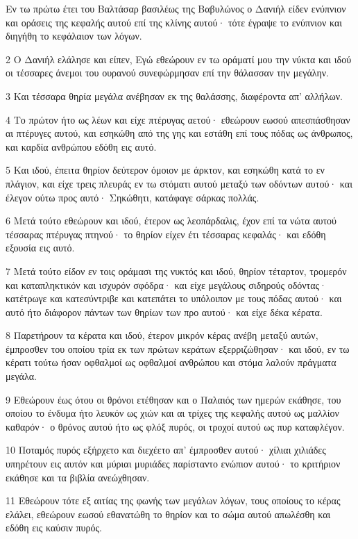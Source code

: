 \par Εν τω πρώτω έτει του Βαλτάσαρ βασιλέως της Βαβυλώνος ο Δανιήλ είδεν ενύπνιον και οράσεις της κεφαλής αυτού επί της κλίνης αυτού· τότε έγραψε το ενύπνιον και διηγήθη το κεφάλαιον των λόγων.
\par 2 Ο Δανιήλ ελάλησε και είπεν, Εγώ εθεώρουν εν τω οράματί μου την νύκτα και ιδού οι τέσσαρες άνεμοι του ουρανού συνεφώρμησαν επί την θάλασσαν την μεγάλην.
\par 3 Και τέσσαρα θηρία μεγάλα ανέβησαν εκ της θαλάσσης, διαφέροντα απ' αλλήλων.
\par 4 Το πρώτον ήτο ως λέων και είχε πτέρυγας αετού· εθεώρουν εωσού απεσπάσθησαν αι πτέρυγες αυτού, και εσηκώθη από της γης και εστάθη επί τους πόδας ως άνθρωπος, και καρδία ανθρώπου εδόθη εις αυτό.
\par 5 Και ιδού, έπειτα θηρίον δεύτερον όμοιον με άρκτον, και εσηκώθη κατά το εν πλάγιον, και είχε τρεις πλευράς εν τω στόματι αυτού μεταξύ των οδόντων αυτού· και έλεγον ούτω προς αυτό· Σηκώθητι, κατάφαγε σάρκας πολλάς.
\par 6 Μετά τούτο εθεώρουν και ιδού, έτερον ως λεοπάρδαλις, έχον επί τα νώτα αυτού τέσσαρας πτέρυγας πτηνού· το θηρίον είχεν έτι τέσσαρας κεφαλάς· και εδόθη εξουσία εις αυτό.
\par 7 Μετά τούτο είδον εν τοις οράμασι της νυκτός και ιδού, θηρίον τέταρτον, τρομερόν και καταπληκτικόν και ισχυρόν σφόδρα· και είχε μεγάλους σιδηρούς οδόντας· κατέτρωγε και κατεσύντριβε και κατεπάτει το υπόλοιπον με τους πόδας αυτού· και αυτό ήτο διάφορον πάντων των θηρίων των προ αυτού· και είχε δέκα κέρατα.
\par 8 Παρετήρουν τα κέρατα και ιδού, έτερον μικρόν κέρας ανέβη μεταξύ αυτών, έμπροσθεν του οποίου τρία εκ των πρώτων κεράτων εξερριζώθησαν· και ιδού, εν τω κέρατι τούτω ήσαν οφθαλμοί ως οφθαλμοί ανθρώπου και στόμα λαλούν πράγματα μεγάλα.
\par 9 Εθεώρουν έως ότου οι θρόνοι ετέθησαν και ο Παλαιός των ημερών εκάθησε, του οποίου το ένδυμα ήτο λευκόν ως χιών και αι τρίχες της κεφαλής αυτού ως μαλλίον καθαρόν· ο θρόνος αυτού ήτο ως φλόξ πυρός, οι τροχοί αυτού ως πυρ καταφλέγον.
\par 10 Ποταμός πυρός εξήρχετο και διεχέετο απ' έμπροσθεν αυτού· χίλιαι χιλιάδες υπηρέτουν εις αυτόν και μύριαι μυριάδες παρίσταντο ενώπιον αυτού· το κριτήριον εκάθησε και τα βιβλία ανεώχθησαν.
\par 11 Εθεώρουν τότε εξ αιτίας της φωνής των μεγάλων λόγων, τους οποίους το κέρας ελάλει, εθεώρουν εωσού εθανατώθη το θηρίον και το σώμα αυτού απωλέσθη και εδόθη εις καύσιν πυρός.
